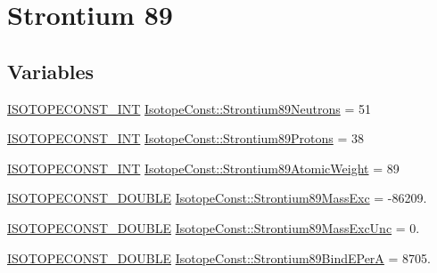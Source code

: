 \hypertarget{group___isotope_const-_strontium-_sr89}{}\section{Strontium 89}
\label{group___isotope_const-_strontium-_sr89}
\subsection*{Variables}
\begin{DoxyCompactItemize}
\item 
\mbox{\hyperlink{group___isotope_const-_macros_ga5f18360b3e99483a35c32d789e62621c}{I\+S\+O\+T\+O\+P\+E\+C\+O\+N\+S\+T\+\_\+\+I\+NT}} \mbox{\hyperlink{group___isotope_const-_strontium-_sr89_ga89b0008dddd2cd5f68be7e2d251ea166}{Isotope\+Const\+::\+Strontium89\+Neutrons}} = 51
\item 
\mbox{\hyperlink{group___isotope_const-_macros_ga5f18360b3e99483a35c32d789e62621c}{I\+S\+O\+T\+O\+P\+E\+C\+O\+N\+S\+T\+\_\+\+I\+NT}} \mbox{\hyperlink{group___isotope_const-_strontium-_sr89_gaf6c53ad64e2b0722dbbd54be029bcb81}{Isotope\+Const\+::\+Strontium89\+Protons}} = 38
\item 
\mbox{\hyperlink{group___isotope_const-_macros_ga5f18360b3e99483a35c32d789e62621c}{I\+S\+O\+T\+O\+P\+E\+C\+O\+N\+S\+T\+\_\+\+I\+NT}} \mbox{\hyperlink{group___isotope_const-_strontium-_sr89_ga4656d6dcf290b4439b1a6c89d85427eb}{Isotope\+Const\+::\+Strontium89\+Atomic\+Weight}} = 89
\item 
\mbox{\hyperlink{group___isotope_const-_macros_ga8f45a7272ce02c0b4c65c44636ed719a}{I\+S\+O\+T\+O\+P\+E\+C\+O\+N\+S\+T\+\_\+\+D\+O\+U\+B\+LE}} \mbox{\hyperlink{group___isotope_const-_strontium-_sr89_ga2b0bfb0727eb359f05b389a592bd5da4}{Isotope\+Const\+::\+Strontium89\+Mass\+Exc}} = -\/86209.
\item 
\mbox{\hyperlink{group___isotope_const-_macros_ga8f45a7272ce02c0b4c65c44636ed719a}{I\+S\+O\+T\+O\+P\+E\+C\+O\+N\+S\+T\+\_\+\+D\+O\+U\+B\+LE}} \mbox{\hyperlink{group___isotope_const-_strontium-_sr89_ga6c660c9a7d04266d3617e4c5a599fa8d}{Isotope\+Const\+::\+Strontium89\+Mass\+Exc\+Unc}} = 0.
\item 
\mbox{\hyperlink{group___isotope_const-_macros_ga8f45a7272ce02c0b4c65c44636ed719a}{I\+S\+O\+T\+O\+P\+E\+C\+O\+N\+S\+T\+\_\+\+D\+O\+U\+B\+LE}} \mbox{\hyperlink{group___isotope_const-_strontium-_sr89_ga9c06cec7052a2f848facdfc38e76c42e}{Isotope\+Const\+::\+Strontium89\+Bind\+E\+PerA}} = 8705.
\item 

\end{DoxyCompactItemize}

